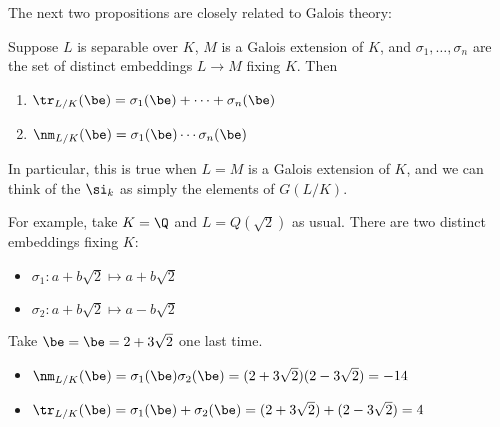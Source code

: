 \noindent The next two propositions are closely related to Galois theory:

\begin{pr}
Suppose $L$ is separable over $K$, $M$ is a Galois extension of $K$, and $\sigma_1,\ldots, \sigma_n$ are the set of distinct embeddings $L\to M$ fixing $K$. 
Then
\begin{enumerate}
\item
$\tr_{L/K}(\be)=\sigma_1(\be)+\cdots +\sigma_n(\be)$
\item
$\nm_{L/K}(\be)=\sigma_1(\be)\cdots \sigma_n(\be)$
\end{enumerate}
In particular, this is true when $L=M$ is a Galois extension of $K$, and we can think of the $\si_k$ as simply the elements of $G(L/K)$.
\end{pr}
\begin{ex}
For example, take $K=\Q$ and $L=Q(\sqrt{2})$ as usual. There are two distinct embeddings fixing $K$:
\begin{itemize}
\item $\sigma_1 : a + b\sqrt{2} \mapsto a + b\sqrt{2}$
\item $\sigma_2 : a + b\sqrt{2} \mapsto a - b\sqrt{2}$
\end{itemize}
Take $\be = \be = 2+3\sqrt{2}$ one last time.
\begin{itemize}
\item $\nm_{L/K}(\be) = \sigma_1(\be) \sigma_2(\be) = (2+3\sqrt{2})(2-3\sqrt{2}) = -14$
\item $\tr_{L/K}(\be) = \sigma_1(\be) + \sigma_2(\be) = (2+3\sqrt{2})+(2-3\sqrt{2}) = 4$
\end{itemize}
\end{ex}
